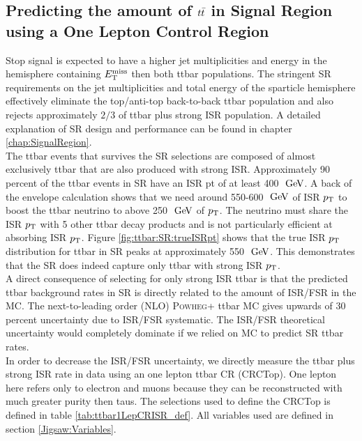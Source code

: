 \subsection{Predicting the amount of $t\bar{t}$ in Signal Region using a One Lepton Control Region}
\label{sec:Bkg:ttbar:CR}

\indent Stop signal is expected to have a higher jet multiplicities and energy in the hemisphere containing $E_{\mathrm{T}}^{\mathrm{miss}}$ then both ttbar populations.  The stringent SR requirements on the jet multiplicities and total energy of the sparticle hemisphere effectively eliminate the top/anti-top back-to-back ttbar population and also rejects approximately $2/3$ of ttbar plus strong ISR population.  A detailed explanation of SR design and performance can be found in chapter \ref{chap:SignalRegion}. \\

\indent The ttbar events that survives the SR selections are composed of almost exclusively ttbar that are also produced with strong ISR.  Approximately 90 percent of the ttbar events in SR have an ISR pt of at least 400 $\gev$.  A back of the envelope calculation shows that we need around 550-600 $\gev$ of ISR $p_{\mathrm{T}}$ to boost the ttbar neutrino to above 250 $\gev$ of $p_{\mathrm{T}}$.  The neutrino must share the ISR $p_{\mathrm{T}}$ with 5 other ttbar decay products and is not particularly efficient at absorbing ISR $p_{\mathrm{T}}$.  Figure \ref{fig:ttbar:SR:trueISRpt} shows that the true ISR $p_{\mathrm{T}}$ distribution for ttbar in SR peaks at approximately 550 $\gev$.  This demonstrates that the SR does indeed capture only ttbar with strong ISR $p_{\mathrm{T}}$.  \\

\indent A direct consequence of selecting for only strong ISR ttbar is that the predicted ttbar background rates in SR is directly related to the amount of ISR/FSR in the MC.  The next-to-leading order (NLO) \textsc{Powheg+} ttbar MC gives upwards of 30 percent uncertainty due to ISR/FSR systematic.  The ISR/FSR theoretical uncertainty would completely dominate if we relied on MC to predict SR ttbar rates.  \\

\indent In order to decrease the ISR/FSR uncertainty, we directly measure the ttbar plus strong ISR rate in data using an one lepton ttbar CR (CRCTop).  One lepton here refers only to electron and muons because they can be reconstructed with much greater purity then taus.  The selections used to define the CRCTop is defined in table \ref{tab:ttbar1LepCRISR_def}. All variables used are defined in section \ref{Jigsaw:Variables}. \\

